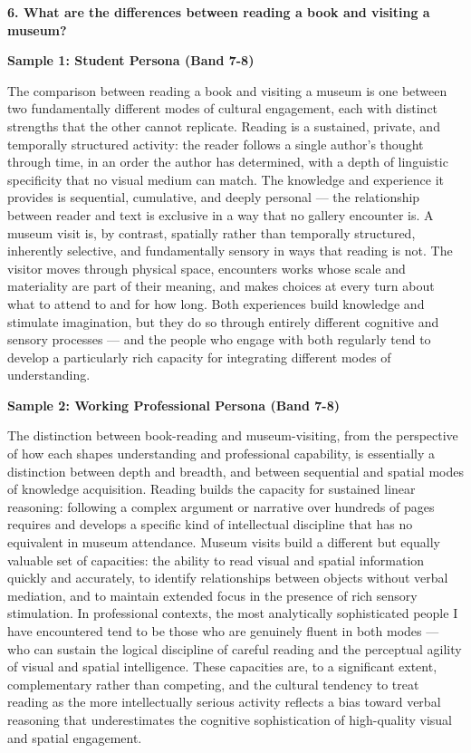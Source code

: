 \separator

\begin{ieltsquestion}
\textbf{6. What are the differences between reading a book and visiting a museum?}
\end{ieltsquestion}
\textbf{Sample 1: Student Persona (Band 7-8)}

The comparison between reading a book and visiting a museum is one between two fundamentally different modes of cultural engagement, each with distinct strengths that the other cannot replicate. Reading is a sustained, private, and temporally structured activity: the reader follows a single author's thought through time, in an order the author has determined, with a depth of linguistic specificity that no visual medium can match. The knowledge and experience it provides is sequential, cumulative, and deeply personal — the relationship between reader and text is exclusive in a way that no gallery encounter is. A museum visit is, by contrast, spatially rather than temporally structured, inherently selective, and fundamentally sensory in ways that reading is not. The visitor moves through physical space, encounters works whose scale and materiality are part of their meaning, and makes choices at every turn about what to attend to and for how long. Both experiences build knowledge and stimulate imagination, but they do so through entirely different cognitive and sensory processes — and the people who engage with both regularly tend to develop a particularly rich capacity for integrating different modes of understanding.

\textbf{Sample 2: Working Professional Persona (Band 7-8)}

The distinction between book-reading and museum-visiting, from the perspective of how each shapes understanding and professional capability, is essentially a distinction between depth and breadth, and between sequential and spatial modes of knowledge acquisition. Reading builds the capacity for sustained linear reasoning: following a complex argument or narrative over hundreds of pages requires and develops a specific kind of intellectual discipline that has no equivalent in museum attendance. Museum visits build a different but equally valuable set of capacities: the ability to read visual and spatial information quickly and accurately, to identify relationships between objects without verbal mediation, and to maintain extended focus in the presence of rich sensory stimulation. In professional contexts, the most analytically sophisticated people I have encountered tend to be those who are genuinely fluent in both modes — who can sustain the logical discipline of careful reading and the perceptual agility of visual and spatial intelligence. These capacities are, to a significant extent, complementary rather than competing, and the cultural tendency to treat reading as the more intellectually serious activity reflects a bias toward verbal reasoning that underestimates the cognitive sophistication of high-quality visual and spatial engagement.

